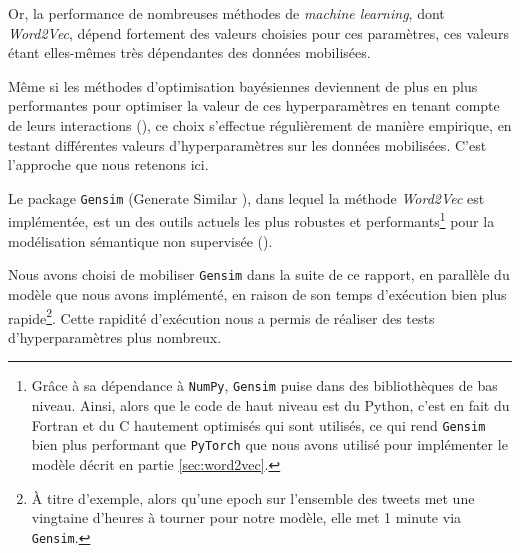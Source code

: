 \documentclass[11pt,french,french]{article}
\let\rmarkdownfootnote\footnote%
\def\footnote{\protect\rmarkdownfootnote}
\begin{document}
Or, la performance de nombreuses méthodes de \emph{machine learning},
dont \emph{Word2Vec}, dépend fortement des valeurs choisies pour ces
paramètres, ces valeurs étant elles-mêmes très dépendantes des données
mobilisées.

Même si les méthodes d'optimisation bayésiennes deviennent de plus en
plus performantes pour optimiser la valeur de ces hyperparamètres en
tenant compte de leurs interactions (\cite{Hutter}), ce choix s'effectue
régulièrement de manière empirique, en testant différentes valeurs
d'hyperparamètres sur les données mobilisées. C'est l'approche que nous
retenons ici.

Le package \texttt{Gensim} (\og Generate Similar \fg{}), dans lequel la
méthode \emph{Word2Vec} est implémentée, est un des outils actuels les
plus robustes et performants\footnote{Grâce à sa dépendance à
  \texttt{NumPy}, \texttt{Gensim} puise dans des bibliothèques de bas
  niveau. Ainsi, alors que le code de haut niveau est du Python, c'est
  en fait du Fortran et du C hautement optimisés qui sont utilisés, ce
  qui rend \texttt{Gensim} bien plus performant que \texttt{PyTorch} que
  nous avons utilisé pour implémenter le modèle décrit en partie
  \ref{sec:word2vec}.} pour la modélisation sémantique non supervisée
(\cite{Rehurek}).

Nous avons choisi de mobiliser \texttt{Gensim} dans la suite de ce
rapport, en parallèle du modèle que nous avons implémenté, en raison de
son temps d'exécution bien plus rapide\footnote{À titre d'exemple, alors
  qu'une epoch sur l'ensemble des tweets met une vingtaine d'heures à
  tourner pour \og notre \fg{} modèle, elle met 1 minute via
  \texttt{Gensim}.}. Cette rapidité d'exécution nous a permis de
réaliser des tests d'hyperparamètres plus nombreux.
\end{document}
